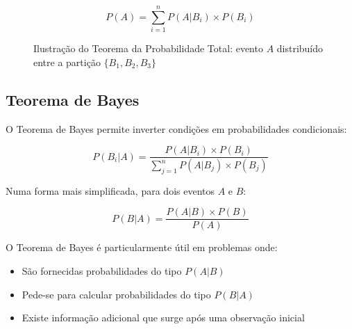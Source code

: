 \documentclass[a4paper,12pt]{article}
\begin{document}
\begin{equation}
P(A) = \sum_{i=1}^{n} P(A|B_i) \times P(B_i)
\end{equation}

\begin{figure}[H]
\centering
{}
\caption{Ilustração do Teorema da Probabilidade Total: evento $A$ distribuído entre a partição $\{B_1, B_2, B_3\}$}
\end{figure}

\subsection{Teorema de Bayes}

O Teorema de Bayes permite inverter condições em probabilidades condicionais:

\begin{equation}
P(B_i|A) = \frac{P(A|B_i) \times P(B_i)}{\sum_{j=1}^{n} P(A|B_j) \times P(B_j)}
\end{equation}

Numa forma mais simplificada, para dois eventos $A$ e $B$:

\begin{equation}
P(B|A) = \frac{P(A|B) \times P(B)}{P(A)}
\end{equation}

\begin{tcolorbox}[colback=orange!5, colframe=orange!50, title=\textbf{Dica para Aplicar o Teorema de Bayes}]
O Teorema de Bayes é particularmente útil em problemas onde:
\begin{itemize}
    \item São fornecidas probabilidades do tipo $P(A|B)$
    \item Pede-se para calcular probabilidades do tipo $P(B|A)$
    \item Existe informação adicional que surge após uma observação inicial
\end{itemize}
\end{tcolorbox}
\end{document}
